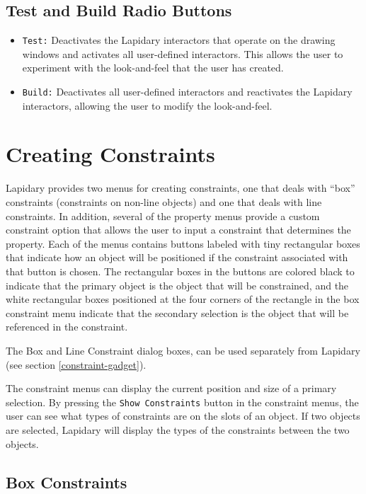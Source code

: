 \section{Test and Build Radio Buttons}
\begin{itemize}
\item {}
{\tt Test:} Deactivates the Lapidary interactors that operate
on the drawing windows and activates all user-defined interactors. This allows
the user to experiment with the look-and-feel that the user has created.

\item {}
{\tt Build:} Deactivates all user-defined interactors and reactivates the Lapidary
interactors, allowing the user to modify the look-and-feel.
\end{itemize}



\chapter{Creating Constraints}
\label{constraints}

Lapidary provides two menus for creating constraints, one that deals with
``box'' constraints (constraints on non-line objects)
and one that deals with line constraints.
In addition, several of the property menus provide a custom constraint option
that allows the user to input a constraint that determines the property.
Each of the menus contains buttons labeled with tiny rectangular boxes that
indicate how an object will be positioned if the constraint associated with
that button is chosen.
The rectangular boxes in the buttons are colored black to indicate that
the primary object is the object that will be constrained, and
the white rectangular
boxes positioned at the four corners of the rectangle in the box constraint
menu indicate that the secondary selection is the object that
will be referenced in the constraint.

The Box and Line Constraint dialog boxes, can be used separately from Lapidary
(see section \ref{constraint-gadget}).

The constraint menus can display the current position and size of a primary
selection. By pressing the {\tt Show Constraints} button in the constraint menus,
the user can see what types of constraints are on the slots of an object.
If two objects are selected, Lapidary will display the types of the
constraints between the two objects.

\section{Box Constraints}
\label{box-constraint-section}

